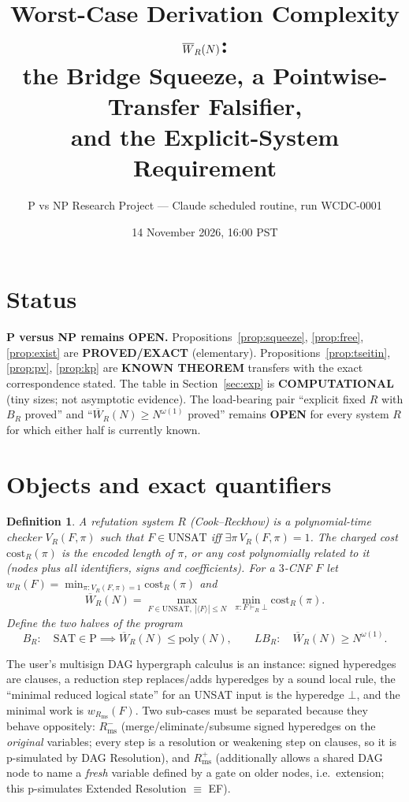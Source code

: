 \documentclass[11pt]{article}
\title{Worst-Case Derivation Complexity $\Wb_R(N)$:\\ the Bridge Squeeze, a Pointwise-Transfer Falsifier,\\ and the Explicit-System Requirement}
\author{P vs NP Research Project --- Claude scheduled routine, run WCDC-0001}
\date{14 November 2026, 16:00 PST}
\newtheorem{definition}[theorem]{Definition}
\newcommand{\SAT}{\mathrm{SAT}}
\newcommand{\UNSAT}{\mathrm{UNSAT}}
\newcommand{\poly}{\mathrm{poly}}
\newcommand{\Wb}{\overline W}
\begin{document}
\maketitle

\section*{Status}
\textbf{P versus NP remains OPEN.} Propositions~\ref{prop:squeeze}, \ref{prop:free}, \ref{prop:exist}
are \textbf{PROVED/EXACT} (elementary). Propositions~\ref{prop:tseitin}, \ref{prop:pv},
\ref{prop:kp} are \textbf{KNOWN THEOREM} transfers with the exact correspondence stated.
The table in Section~\ref{sec:exp} is \textbf{COMPUTATIONAL} (tiny sizes; not asymptotic evidence).
The load-bearing pair ``explicit fixed $R$ with $B_R$ proved'' and ``$\Wb_R(N)\ge N^{\omega(1)}$ proved''
remains \textbf{OPEN} for every system $R$ for which either half is currently known.

\section{Objects and exact quantifiers}
\begin{definition}
A \emph{refutation system} $R$ (Cook--Reckhow) is a polynomial-time checker $V_R(F,\pi)$ such that
$F\in\UNSAT$ iff $\exists\pi\,V_R(F,\pi)=1$. The charged cost $\mathrm{cost}_R(\pi)$ is the encoded
length of $\pi$, or any cost polynomially related to it (nodes plus all identifiers, signs and
coefficients). For a $3$-CNF $F$ let $w_R(F)=\min_{\pi:V_R(F,\pi)=1}\mathrm{cost}_R(\pi)$ and
\[
 \Wb_R(N)=\max_{F\in\UNSAT,\ |\langle F\rangle|\le N}\ \min_{\pi:F\vdash_R\bot}\mathrm{cost}_R(\pi).
\]
Define the two halves of the program
\[
 B_R:\quad \SAT\in\mathrm P\implies \Wb_R(N)\le \poly(N),\qquad
 LB_R:\quad \Wb_R(N)\ge N^{\omega(1)} .
\]
\end{definition}
The user's multisign DAG hypergraph calculus is an instance: signed hyperedges are clauses,
a reduction step replaces/adds hyperedges by a sound local rule, the ``minimal reduced logical state''
for an UNSAT input is the hyperedge $\bot$, and the minimal work is $w_{R_{\mathrm{ms}}}(F)$.
Two sub-cases must be separated because they behave oppositely:
$R_{\mathrm{ms}}^{-}$ (merge/eliminate/subsume signed hyperedges on the \emph{original} variables; every
step is a resolution or weakening step on clauses, so it is p-simulated by DAG Resolution), and
$R_{\mathrm{ms}}^{+}$ (additionally allows a shared DAG node to name a \emph{fresh} variable defined
by a gate on older nodes, i.e.\ extension; this p-simulates Extended Resolution $\equiv$ EF).
\end{document}
